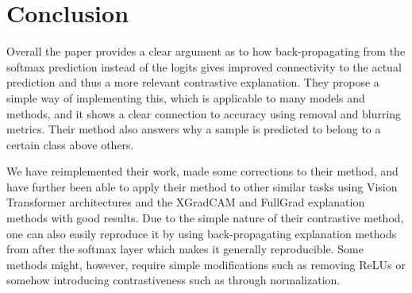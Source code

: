 \section{Conclusion}

Overall the paper provides a clear argument as to how back-propagating from the softmax prediction instead of the logits gives improved connectivity to the actual prediction and thus a more relevant contrastive explanation. They propose a simple way of implementing this, which is applicable to many models and methods, and it shows a clear connection to accuracy using removal and blurring metrics. Their method also answers why a sample is predicted to belong to a certain class above others.

We have reimplemented their work, made some corrections to their method, and have further been able to apply their method to other similar tasks using Vision Transformer architectures and the XGradCAM and FullGrad explanation methods with good results. Due to the simple nature of their contrastive method, one can also easily reproduce it by using back-propagating explanation methods from after the softmax layer which makes it generally reproducible. Some methods might, however, require simple modifications such as removing ReLUs or somehow introducing contrastiveness such as through normalization. 

